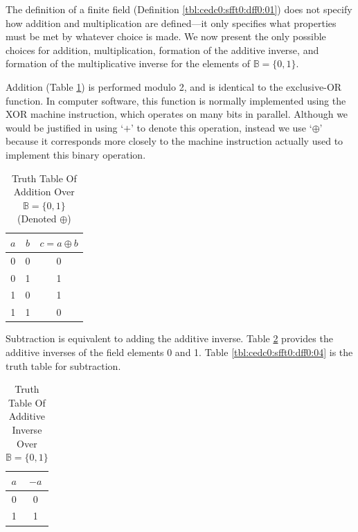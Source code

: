 The definition of a finite field (Definition \ref{tbl:cedc0:sfft0:dff0:01}) 
does not specify how addition and multiplication are defined---it only
specifies what properties must be met by whatever choice is made.
We now present the only possible choices for addition, multiplication,
formation of the additive inverse, and formation of the multiplicative inverse
for the elements of $\mathbb{B}=\{ 0,1 \}$.

Addition (Table \ref{tbl:cedc0:sfft0:dff0:02}) is performed modulo 2, and is 
identical to the exclusive-OR 
function.  In computer software, this function is normally implemented using
the XOR machine instruction, which operates on many bits in parallel.  Although
we would be justified in using `$+$' to denote this operation, instead we
use `$\oplus$' because it corresponds more closely to the machine instruction
actually used to implement this binary operation.

\begin{table}
\caption{Truth Table Of Addition Over $\mathbb{B}=\{ 0,1 \}$ (Denoted $\oplus$)}
\label{tbl:cedc0:sfft0:dff0:02}
\begin{center}
\begin{tabular}{|c|c|c|}
\hline
$a$           &  $b$                  & $c = a \oplus b$     \\
\hline
\hline
0             & 0                     & 0                     \\
\hline
0             & 1                     & 1                     \\
\hline
1             & 0                     & 1                     \\
\hline
1             & 1                     & 0                     \\
\hline
\end{tabular}
\end{center}
\end{table}

Subtraction is equivalent to adding the additive inverse.  
Table \ref{tbl:cedc0:sfft0:dff0:03} provides the
additive inverses of the field elements 0 and 1.  Table
\ref{tbl:cedc0:sfft0:dff0:04} is the truth table for subtraction.

\begin{table}
\caption{Truth Table Of Additive Inverse Over $\mathbb{B}=\{ 0,1 \}$}
\label{tbl:cedc0:sfft0:dff0:03}
\begin{center}
\begin{tabular}{|c|c|}
\hline
$a$           &  $-a$                 \\
\hline
\hline
0             & 0                     \\
\hline
1             & 1                     \\
\hline
\end{tabular}
\end{center}
\end{table}

